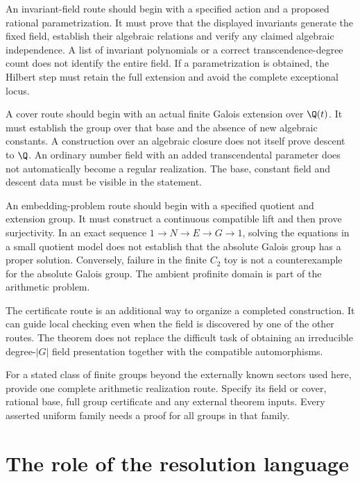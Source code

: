 An invariant-field route should begin with a specified action and a proposed rational parametrization. It must prove that the displayed invariants generate the fixed field, establish their algebraic relations and verify any claimed algebraic independence. A list of invariant polynomials or a correct transcendence-degree count does not identify the entire field. If a parametrization is obtained, the Hilbert step must retain the full extension and avoid the complete exceptional locus.

A cover route should begin with an actual finite Galois extension over $\Q(t)$. It must establish the group over that base and the absence of new algebraic constants. A construction over an algebraic closure does not itself prove descent to $\Q$. An ordinary number field with an added transcendental parameter does not automatically become a regular realization. The base, constant field and descent data must be visible in the statement.

An embedding-problem route should begin with a specified quotient and extension group. It must construct a continuous compatible lift and then prove surjectivity. In an exact sequence $1\to N\to E\to G\to1$, solving the equations in a small quotient model does not establish that the absolute Galois group has a proper solution. Conversely, failure in the finite $C_2$ toy is not a counterexample for the absolute Galois group. The ambient profinite domain is part of the arithmetic problem.

The certificate route is an additional way to organize a completed construction. It can guide local checking even when the field is discovered by one of the other routes. The theorem does not replace the difficult task of obtaining an irreducible degree-$|G|$ field presentation together with the compatible automorphisms.

\begin{openproblem}
For a stated class of finite groups beyond the externally known sectors used here, provide one complete arithmetic realization route. Specify its field or cover, rational base, full group certificate and any external theorem inputs. Every asserted uniform family needs a proof for all groups in that family.
\end{openproblem}

\section{The role of the resolution language}

